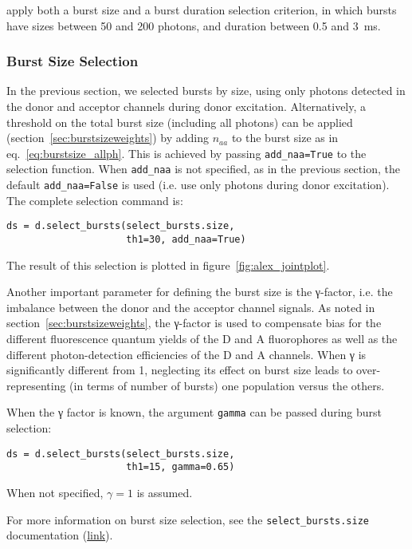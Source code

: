 apply both a burst size and a burst duration selection criterion, in which bursts
have sizes between 50 and 200 photons, and duration between 0.5 and 3~ms.

\subsubsection{Burst Size Selection}

In the previous section, we selected bursts by size, using only photons
detected in the  donor and acceptor channels during donor excitation.
Alternatively, a threshold on the total burst size (including all photons) can be applied
(section~\ref{sec:burstsizeweights}) by adding $n_{aa}$ to the burst size
as in eq.~\ref{eq:burstsize_allph}. This is achieved
by passing \verb|add_naa=True| to the selection function. When \verb|add_naa| is not specified,
as in the previous section, the default \verb|add_naa=False| is used
(i.e. use only photons during donor excitation). The complete selection command
is:

\begin{lstlisting}
ds = d.select_bursts(select_bursts.size,
                     th1=30, add_naa=True)
\end{lstlisting}

\noindent The result of this selection is plotted in figure~\ref{fig:alex_jointplot}.

Another important parameter for defining the burst size is the γ-factor, i.e.
the imbalance between the donor and the acceptor channel signals. As noted in
section~\ref{sec:burstsizeweights}, the γ-factor is
used to compensate bias for the different fluorescence quantum yields of the D and A
fluorophores as well as the different photon-detection efficiencies of the D and A channels.
When γ is significantly different from 1, neglecting its effect on burst size leads to
over-representing (in terms of number of bursts) one population versus the others.

When the γ factor is known, the argument
\verb|gamma| can be passed during burst selection:

\begin{lstlisting}
ds = d.select_bursts(select_bursts.size,
                     th1=15, gamma=0.65)
\end{lstlisting}

When not specified, $\gamma=1$ is assumed.

For more information on burst size selection, see the
\verb|select_bursts.size| documentation
(\href{http://fretbursts.readthedocs.org/en/latest/burst_selection.html#fretbursts.select_bursts.size}{link}).

